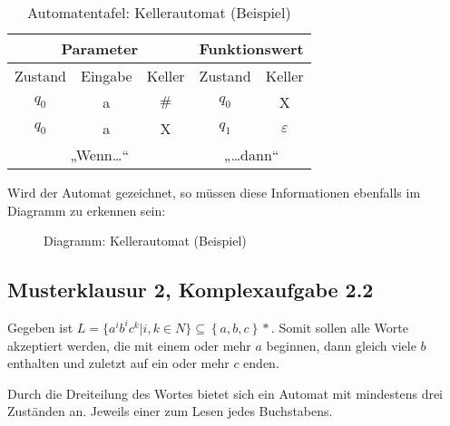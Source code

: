 \begin{table}[h]
\centering
\begin{tabular}{|c|c|c||c|c|}
\hline
\multicolumn{3}{|c||}{Parameter} & \multicolumn{2}{c|}{Funktionswert} \\ \hline
Zustand   & Eingabe   & Keller  & Zustand          & Keller          \\ \hline
$q_0$       & a         & $\#$       & $q_0$              & X               \\ \hline
$q_0$       & a         & X       & $q_1$              & $\varepsilon$               \\ \hline
\multicolumn{3}{|c||}{„Wenn…“} & \multicolumn{2}{c|}{„…dann“} \\ \hline
\end{tabular}
\caption{Automatentafel: Kellerautomat (Beispiel)}
\label{tbl:bspkeller}
\end{table}

Wird der Automat gezeichnet, so müssen diese Informationen ebenfalls im Diagramm zu erkennen sein:

\begin{figure}[H]
\centering
{}
\caption{Diagramm: Kellerautomat (Beispiel)}
\label{fig:bspkeller}
\end{figure}


\subsection{Musterklausur 2, Komplexaufgabe 2.2}
\label{sec:mk2-2}

Gegeben ist $L=\{ { a }^{ i }{ b }^{ i }{ c }^{ k }|i,k\in { N }\} \subseteq \left\{ a,b,c \right\} *$.
Somit sollen alle Worte akzeptiert werden, die mit einem oder mehr $a$ beginnen, dann gleich viele $b$ enthalten 
und zuletzt auf ein oder mehr $c$ enden.

Durch die Dreiteilung des Wortes bietet sich ein Automat mit mindestens drei Zuständen an. Jeweils einer zum 
Lesen jedes Buchstabens.

